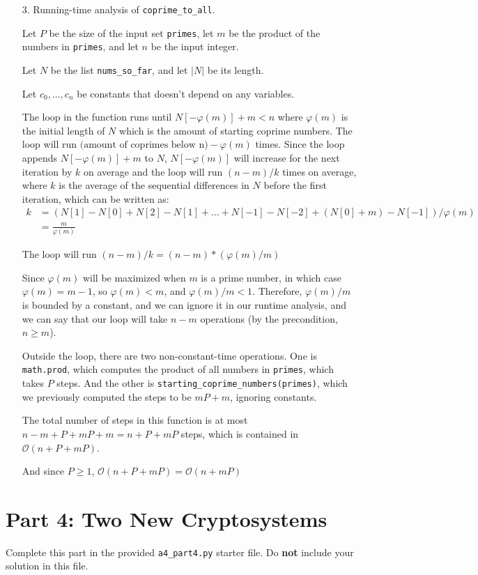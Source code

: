 \documentclass[fontsize=11pt]{article}
\newcommand{\cO}{\mathcal{O}}
\newcommand{\code}[1]{\texttt{#1}}
\begin{document}
\begin{enumerate}
\item[3.]
Running-time analysis of \texttt{coprime\_to\_all}.

Let $P$ be the size of the input set \code{primes}, let $m$ be the product of the numbers in \code{primes}, and let $n$ be the input integer.

Let $N$ be the list \code{nums\_so\_far}, and let $|N|$ be its length.

Let $c_0, \dots, c_n$ be constants that doesn't depend on any variables.

The loop in the function runs until $N[-\varphi(m)] + m < n$ where $\varphi(m)$ is the initial length of $N$ which is the amount of starting coprime numbers. The loop will run $\text{(amount of coprimes below n)} - \varphi(m)$ times. Since the loop appends $N[-\varphi(m)] + m$ to $N$, $N[-\varphi(m)]$ will increase for the next iteration by $k$ on average and the loop will run $(n - m) / k$ times on average, where $k$ is the average of the sequential differences in $N$ before the first iteration, which can be written as:
\begin{align}
    k &= (N[1] - N[0] + N[2] - N[1] + \dots + N[-1] - N[-2] + (N[0] + m) - N[-1]) / \varphi(m)\\
    &= \frac{m}{\varphi(m)}
\end{align}

The loop will run $(n - m) / k  = (n - m) * (\varphi(m) / m)$

Since $\varphi(m)$ will be maximized when $m$ is a prime number, in which case $\varphi(m) = m - 1$, so $\varphi(m) < m$, and $\varphi(m) / m < 1$. Therefore, $\varphi(m) / m$ is bounded by a constant, and we can ignore it in our runtime analysis, and we can say that our loop will take $n - m$ operations (by the precondition, $n \ge m$).

Outside the loop, there are two non-constant-time operations. One is \code{math.prod}, which computes the product of all numbers in \code{primes}, which takes $P$ steps. And the other is \code{starting\_coprime\_numbers(primes)}, which we previously computed the steps to be $mP + m$, ignoring constants.

The total number of steps in this function is at most $n - m + P + mP + m = n + P + mP$ steps, which is contained in $\cO(n + P + mP)$.

And since $P \ge 1$, $\cO(n + P + mP) = \cO(n + mP)$

\end{enumerate}

\section*{Part 4: Two New Cryptosystems}

Complete this part in the provided \texttt{a4\_part4.py} starter file.
Do \textbf{not} include your solution in this file.
\end{document}
